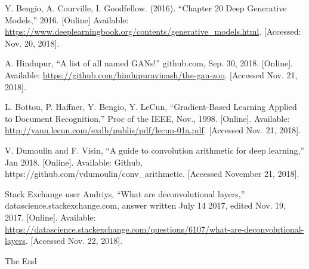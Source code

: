 \documentclass{beamer}
\begin{document}
\begin{frame}[allowframebreaks]
{\begin{thebibliography}{99}
 Y. Bengio, A. Courville, I. Goodfellow. (2016). ``Chapter 20 Deep Generative Models,'' 2016. [Online] Available: \url{https://www.deeplearningbook.org/contents/generative_models.html}. [Accessed: Nov. 20, 2018].

 A. Hindupur, ``A list of all named GANs!'' github.com, Sep. 30,
2018. [Online]. Available: \url{https://github.com/hindupuravinash/the-gan-zoo}. 
[Accessed Nov. 21, 2018]. 

 L. Bottou, P. Haffner, Y. Bengio, Y. LeCun, ``Gradient-Based Learning
Applied to Document Recognition,'' Proc of the IEEE, Nov., 1998. [Online]. Available:
\url{http://yann.lecun.com/exdb/publis/pdf/lecun-01a.pdf}. [Accessed Nov. 21, 2018].

 V. Dumoulin and F. Visin, ``A guide to convolution arithmetic for 
deep learning,'' Jan 2018. [Online]. Available: Github, https://github.com/vdumoulin/conv\_arithmetic.  [Accessed November 21, 2018].

 Stack Exchange user Andriys, ``What are deconvolutional layers,''
datascience.stackexchange.com, answer written July 14 2017, edited Nov. 19, 2017. 
[Online]. Available: 
\url{https://datascience.stackexchange.com/questions/6107/what-are-deconvolutional-layers}. 
[Accessed Nov.  22, 2018].
\end{thebibliography}
}
\end{frame}


\begin{frame}
\Huge{\centerline{The End}}
\end{frame}

\end{document}
